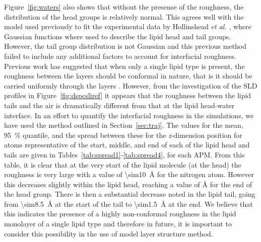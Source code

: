 Figure~\ref{fig:waters} also shows that without the presense of the roughness, the distribution of the head groups is relatively normal.
This agrees well with the model used previously to fit the experimental data by Hollinshead \emph{et al.} \cite{hollinshead_effects_2009}, where Gaussian functions where used to describe the lipid head and tail groups.
However, the tail group distribution is not Gaussian and this previous method failed to include any additional factors to account for interfacial roughness.
Previous work has suggested that when only a single lipid type is present, the roughness between the layers should be conformal in nature, that is it should be carried uniformly through the layers \cite{kozhevnikov_general_2012,campbell_structure_2018}.
However, from the investigation of the SLD profiles in Figure~\ref{fig:dspcsliref} it appears that the roughness between the lipid tails and the air is dramatically different from that at the lipid head-water interface.
In an effort to quantify the interfacial roughness in the simulations, we have used the method outlined in Section~\ref{sec:traj}.
The values for the mean, \SI{95}{\percent} quantile, and the spread between these for the \emph{z}-dimension position for atoms representative of the start, middle, and end of each of the lipid head and tails are given in Tables~\ref{tab:spread1}-\ref{tab:spread4}, for each APM.
From this table, it is clear that at the very start of the lipid molecule (at the head) the roughness is very large with a value of \SI{\sim10}{\angstrom} for the nitrogen atom.
However this decreases slightly within the lipid head, reaching a value of \si{\angstrom} for the end of the head group.
There is then a substantial decrease noted in the lipid tail, going from \SI{\sim8.5}{\angstrom} at the start of the tail to \SI{\sim1.5}{\angstrom} at the end.
We believe that this indicates the presence of a highly non-conformal roughness in the lipid monolayer of a single lipid type and therefore in future, it is important to consider this possibility in the use of model layer structure method.
%
